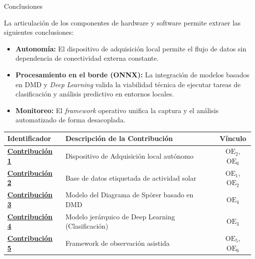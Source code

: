 \documentclass[aspectratio=169]{beamer}
\newcommand{\contrib}[1]{\textcolor{llamativoMagenta}{\textbf{\underline{#1}}}}
\begin{document}
\begin{frame}{Conclusiones}
    \small
    
     La articulación de los componentes de hardware y software permite extraer las siguientes conclusiones:
    
    \begin{itemize}
        \scriptsize
        \item \textbf{Autonomía:} El dispositivo de adquisición local permite el flujo de datos sin dependencia de conectividad externa constante.
        \item \textbf{Procesamiento en el borde (ONNX):} La integración de modelos basados en DMD y \textit{Deep Learning} valida la viabilidad técnica de ejecutar tareas de clasificación y análisis predictivo en entornos locales.
        \item \textbf{Monitoreo:} El \textit{framework} operativo unifica la captura y el análisis automatizado de forma desacoplada.
    \end{itemize}

    \centering
    
    \renewcommand{\arraystretch}{1.2} 
    \begin{table}
        \centering
        \scriptsize
        \begin{tabular}{l|l|c}
            \toprule
            \textbf{Identificador} & \textbf{Descripción de la Contribución} & \textbf{Vínculo} \\ 
            \midrule
            \contrib{Contribución 1} & Dispositivo de Adquisición local autónomo & $\text{OE}_2$, $\text{OE}_6$ \\ 
            \contrib{Contribución 2} & Base de datos etiquetada de actividad solar & $\text{OE}_1$, $\text{OE}_2$ \\ 
            \contrib{Contribución 3} & Modelo del Diagrama de Spörer basado en DMD & $\text{OE}_4$ \\ 
            \contrib{Contribución 4} & Modelo jerárquico de Deep Learning (Clasificación) & $\text{OE}_3$ \\ 
            \contrib{Contribución 5} & Framework de observación asistida & $\text{OE}_5$, $\text{OE}_6$ \\ 
            \bottomrule
        \end{tabular}
    \end{table}
\end{frame}
\end{document}
